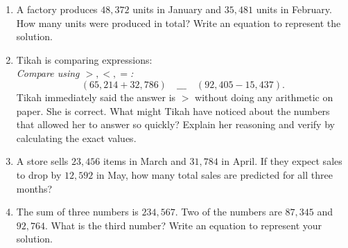 \documentclass[12pt]{article}
\begin{document}
\begin{tcolorbox}[colframe=black!60, colback=white, 
coltitle=black, colbacktitle=black!15, fonttitle=\bfseries\Large, 
title=Problems, halign title=center, left=10pt, right=10pt, top=10pt, bottom=60pt]
\begin{enumerate}[start=9, itemsep=7.5em]
    \item A factory produces \( 48,372 \) units in January and \( 35,481 \) units in February. How many units were produced in total? Write an equation to represent the solution.
\item Tikah is comparing expressions: \\ \textit{Compare using \( >, <, = \):
\[
(65,214 + 32,786) \quad \_\_\_ \quad (92,405 - 15,437).
\] }
Tikah immediately said the answer is \( > \) without doing any arithmetic on paper. She is correct. What might Tikah have noticed about the numbers that allowed her to answer so quickly? Explain her reasoning and verify by calculating the exact values.
    
    \item A store sells \( 23,456 \) items in March and \( 31,784 \) in April. If they expect sales to drop by \( 12,592 \) in May, how many total sales are predicted for all three months?

    \item The sum of three numbers is \( 234,567 \). Two of the numbers are \( 87,345 \) and \( 92,764 \). What is the third number? Write an equation to represent your solution.

    \vspace{3em}

  
\end{enumerate}
\end{tcolorbox}

\vspace{1em}
\end{document}
